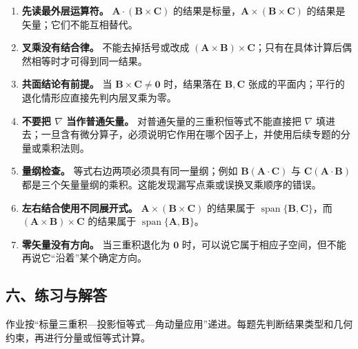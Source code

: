 \begin{enumerate}
\def\labelenumi{\arabic{enumi}.}
\tightlist
\item
  \textbf{先读最外层运算符。}
  \(\mathbf A\cdot(\mathbf B\times\mathbf C)\)
  的结果是标量，\(\mathbf A\times(\mathbf B\times\mathbf C)\)
  的结果是矢量；它们不能互相替代。
\item
  \textbf{叉乘没有结合律。} 不能去掉括号或改成
  \((\mathbf A\times\mathbf B)\times\mathbf C\)；只有在具体计算后偶然相等时才可得到同一结果。
\item
  \textbf{共面结论有前提。} 当 \(\mathbf B\times\mathbf C\ne\mathbf0\)
  时，结果落在 \(\mathbf B,\mathbf C\)
  张成的平面内；平行的退化情形应直接先判内层叉乘为零。
\item
  \textbf{不要把 \(\nabla\) 当作普通矢量。}
  对普通矢量的三重积恒等式不能直接把 \(\nabla\)
  填进去；一旦含有微分算子，必须说明它作用在哪个因子上，并使用后续专题的分量或乘积法则。
\item
  \textbf{量纲检查。} 等式右边两项必须具有同一量纲；例如
  \(\mathbf B(\mathbf A\cdot\mathbf C)\) 与
  \(\mathbf C(\mathbf A\cdot\mathbf B)\)
  都是三个矢量量纲的乘积。这能发现漏写点乘或误换叉乘顺序的错误。
\item
  \textbf{左右结合使用不同展开式。}
  \(\mathbf A\times(\mathbf B\times\mathbf C)\) 的结果属于
  \(\operatorname{span}\{\mathbf B,\mathbf C\}\)，而
  \((\mathbf A\times\mathbf B)\times\mathbf C\) 的结果属于
  \(\operatorname{span}\{\mathbf A,\mathbf B\}\)。
\item
  \textbf{零矢量没有方向。} 当三重积退化为 \(\mathbf0\)
  时，可以说它属于相应子空间，但不能再说它``沿着''某个确定方向。
\end{enumerate}

\subsection{六、练习与解答}\label{m1:ux516dux7ec3ux4e60ux4e0eux89e3ux7b54}

作业按``标量三重积---投影恒等式---角动量应用''递进。每题先判断结果类型和几何约束，再进行分量或恒等式计算。

